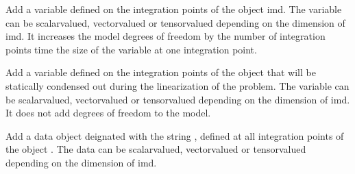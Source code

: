 \documentclass[a4paper,11pt,english]{sphinxmanual}
\begin{document}

\begin{fulllineitems}
\label{\detokenize{userdoc/model_object:_CPPv4N6getfem5model15add_im_variableE4name3imd}}%
\pysigstartmultiline
{}%
\pysigstopmultiline
Add a variable defined on the integration points of the  object imd.
The variable can be scalar\sphinxhyphen{}valued, vector\sphinxhyphen{}valued or tensor\sphinxhyphen{}valued depending on
the dimension of imd.
It increases the model degrees of freedom by the number of integration points
time the size of the variable at one integration point.

\end{fulllineitems}


\begin{fulllineitems}
\label{\detokenize{userdoc/model_object:_CPPv4N6getfem5model24add_internal_im_variableE4name3imd}}%
\pysigstartmultiline
{}%
\pysigstopmultiline
Add a variable defined on the integration points of the  object
 that will be statically condensed out during the linearization of the
problem. The variable can be scalar\sphinxhyphen{}valued, vector\sphinxhyphen{}valued or tensor\sphinxhyphen{}valued
depending on the dimension of imd.
It does not add degrees of freedom to the model.

\end{fulllineitems}


\begin{fulllineitems}
\label{\detokenize{userdoc/model_object:_CPPv4N6getfem5model11add_im_dataE4name3imd}}%
\pysigstartmultiline
{}%
\pysigstopmultiline
Add a data object deignated with the string , defined at all
integration points of the  object .
The data can be scalar\sphinxhyphen{}valued, vector\sphinxhyphen{}valued or tensor\sphinxhyphen{}valued depending on
the dimension of imd.

\end{fulllineitems}
\end{document}
